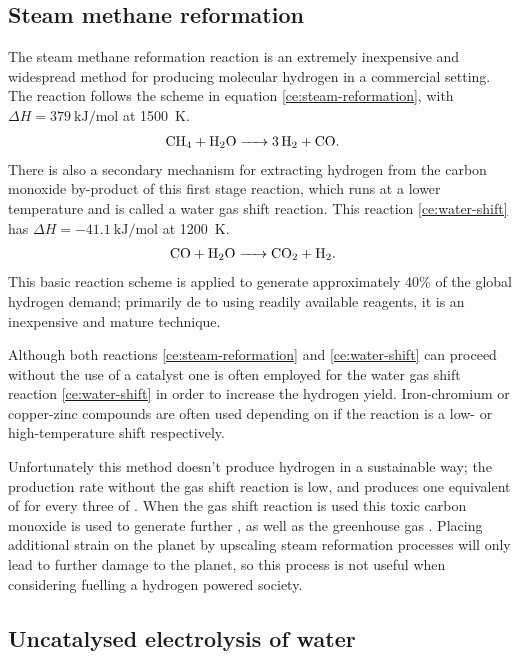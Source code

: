 \subsection{Steam methane reformation}%
\label{sub:steam_methane_reformation}

The steam methane reformation reaction is an extremely inexpensive and widespread method for producing molecular hydrogen in a commercial setting.
The reaction follows the scheme\cite{Saxena2011} in equation \eqref{ce:steam-reformation}, with $\Delta H = \SI{379}{\kilo\joule\per\mole}$ at \SI{1500}{\kelvin}.
\begin{align}
	\ce{CH4 + H2O &-> 3H2 + CO} \label{ce:steam-reformation}
.\end{align}
There is also a secondary mechanism for extracting hydrogen from the carbon monoxide by-product of this first stage reaction, which runs at a lower temperature and is called a water gas shift reaction\cite{Chen2008,Saxena2011}.
This reaction \eqref{ce:water-shift} has $\Delta H = \SI{-41.1}{\kilo\joule\per\mole}$ at \SI{1200}{\kelvin}.
\begin{align}
	\ce{CO + H2O &-> CO2 + H2}\label{ce:water-shift} 
.\end{align}
This basic reaction scheme is applied to generate approximately 40\% of the global hydrogen demand\cite{SBN2020}; primarily de to using readily available reagents, it is an inexpensive and mature technique.

Although both reactions \eqref{ce:steam-reformation} and \eqref{ce:water-shift} can proceed without the use of a catalyst one is often employed for the water gas shift reaction \eqref{ce:water-shift} in order to increase the hydrogen yield.
Iron-chromium or copper-zinc compounds are often used depending on if the reaction is a low- or high-temperature shift respectively.

Unfortunately this method doesn't produce hydrogen in a sustainable way; the production rate without the gas shift reaction is low, and produces one equivalent of  for every three of .
When the gas shift reaction is used this toxic carbon monoxide is used to generate further , as well as the greenhouse gas .
Placing additional strain on the planet by upscaling steam reformation processes will only lead to further damage to the planet, so this process is not useful when considering fuelling a hydrogen powered society.


\subsection{Uncatalysed electrolysis of water}%
\label{sub:uncatalysed_electrolysis_of_water}

